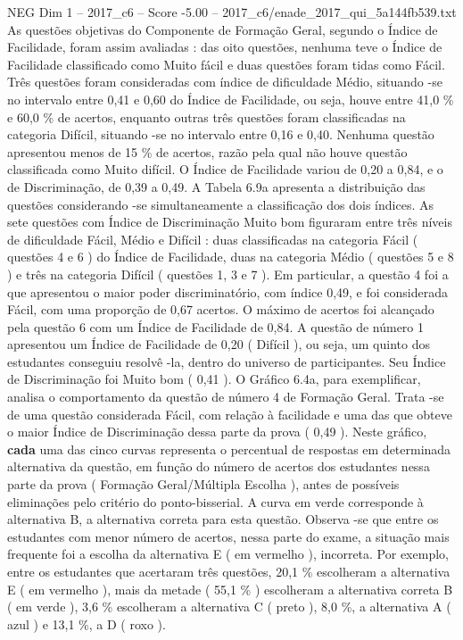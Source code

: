 \begin{textsample}{NEG Dim 1 – 2017\_c6 – Score -5.00 – 2017\_c6/enade\_2017\_qui\_5a144fb539.txt}
As questões objetivas do Componente de Formação Geral, segundo o Índice de Facilidade, foram assim avaliadas : das oito questões, nenhuma teve o Índice de Facilidade classificado como Muito fácil e duas questões foram tidas como Fácil.
Três questões foram consideradas com índice de dificuldade Médio, situando -se no intervalo entre 0,41 e 0,60 do Índice de Facilidade, ou seja, houve entre 41,0 \% e 60,0 \% de acertos, enquanto outras três questões foram classificadas na categoria Difícil, situando -se no intervalo entre 0,16 e 0,40.
Nenhuma questão apresentou menos de 15 \% de acertos, razão pela qual não houve questão classificada como Muito difícil.
O Índice de Facilidade variou de 0,20 a 0,84, e o de Discriminação, de 0,39 a 0,49.
A Tabela 6.9a apresenta a distribuição das questões considerando -se simultaneamente a classificação dos dois índices.
As sete questões com Índice de Discriminação Muito bom figuraram entre três níveis de dificuldade Fácil, Médio e Difícil : duas classificadas na categoria Fácil ( questões 4 e 6 ) do Índice de Facilidade, duas na categoria Médio ( questões 5 e 8 ) e três na categoria Difícil ( questões 1, 3 e 7 ).
Em particular, a questão 4 foi a que apresentou o maior poder discriminatório, com índice 0,49, e foi considerada Fácil, com uma proporção de 0,67 acertos.
O máximo de acertos foi alcançado pela questão 6 com um Índice de Facilidade de 0,84.
A questão de número 1 apresentou um Índice de Facilidade de 0,20 ( Difícil ), ou seja, um quinto dos estudantes conseguiu resolvê -la, dentro do universo de participantes.
Seu Índice de Discriminação foi Muito bom ( 0,41 ).
O Gráfico 6.4a, para exemplificar, analisa o comportamento da questão de número 4 de Formação Geral.
Trata -se de uma questão considerada Fácil, com relação à facilidade e uma das que obteve o maior Índice de Discriminação dessa parte da prova ( 0,49 ).
Neste gráfico, \textbf{cada} uma das cinco curvas representa o percentual de respostas em determinada alternativa da questão, em função do número de acertos dos estudantes nessa parte da prova ( Formação Geral/Múltipla Escolha ), antes de possíveis eliminações pelo critério do ponto-bisserial.
A curva em verde corresponde à alternativa B, a alternativa correta para esta questão.
Observa -se que entre os estudantes com menor número de acertos, nessa parte do exame, a situação mais frequente foi a escolha da alternativa E ( em vermelho ), incorreta.
Por exemplo, entre os estudantes que acertaram três questões, 20,1 \% escolheram a alternativa E ( em vermelho ), mais da metade ( 55,1 \% ) escolheram a alternativa correta B ( em verde ), 3,6 \% escolheram a alternativa C ( preto ), 8,0 \%, a alternativa A ( azul ) e 13,1 \%, a D ( roxo ).

\end{textsample}
